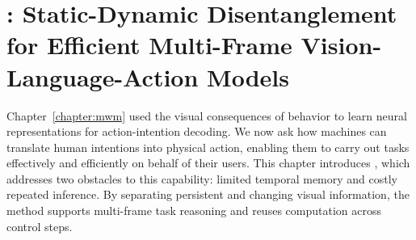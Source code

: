 \chapter{\dysta{}: Static-Dynamic Disentanglement for Efficient Multi-Frame Vision-Language-Action Models}
\label{chapter:dysta}

Chapter~\ref{chapter:mwm} used the visual consequences of behavior to learn neural representations for action-intention decoding. We now ask how machines can translate human intentions into physical action, enabling them to carry out tasks effectively and efficiently on behalf of their users. This chapter introduces \dysta{}, which addresses two obstacles to this capability: limited temporal memory and costly repeated inference. By separating persistent and changing visual information, the method supports multi-frame task reasoning and reuses computation across control steps.








